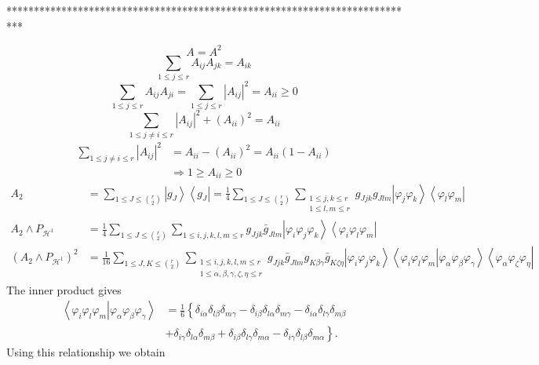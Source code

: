 \documentclass[aps,preprint]{revtex4}%
\begin{document}
\bigskip

***************************************************************************%

\begin{equation}
A=A^{2}%
\end{equation}%
\begin{equation}
\sum_{1\leq j\leq r}A_{ij}A_{jk}=A_{ik}%
\end{equation}%
\begin{equation}
\sum_{1\leq j\leq r}A_{ij}A_{ji}=\sum_{1\leq j\leq r}\left\vert A_{ij}%
\right\vert ^{2}=A_{ii}\geq0
\end{equation}%
\begin{equation}
\sum_{1\leq j\neq i\leq r}\left\vert A_{ij}\right\vert ^{2}+\left(
A_{ii}\right)  ^{2}=A_{ii}%
\end{equation}%
\begin{align}
\sum_{1\leq j\neq i\leq r}\left\vert A_{ij}\right\vert ^{2}  &  =A_{ii}%
-\left(  A_{ii}\right)  ^{2}=A_{ii}\left(  1-A_{ii}\right) \\
&  \Rightarrow1\geq A_{ii}\geq0
\end{align}
\begin{align}
A_{2}  &  =\sum_{1\leq J\leq\binom{r}{2}}\left\vert g_{J}\right\rangle
\left\langle g_{J}\right\vert =\frac{1}{4}\sum_{1\leq J\leq\binom{r}{2}}%
\sum_{\substack{1\leq j,k\leq r\\1\leq l,m\leq r}}g_{Jjk}g_{Jlm}\left\vert
\varphi_{j}\varphi_{k}\right\rangle \left\langle \varphi_{l}\varphi
_{m}\right\vert \\
A_{2}\wedge P_{\mathcal{H}^{1}}  &  =\frac{1}{4}\sum_{1\leq J\leq\binom{r}{2}%
}\sum_{1\leq i,j,k,l,m\leq r}g_{Jjk}\bar{g}_{Jlm}\left\vert \varphi_{i}%
\varphi_{j}\varphi_{k}\right\rangle \left\langle \varphi_{i}\varphi_{l}%
\varphi_{m}\right\vert \\
\left(  A_{2}\wedge P_{\mathcal{H}^{1}}\right)  ^{2}  &  =\frac{1}{16}%
\sum_{1\leq J,K\leq\binom{r}{2}}\sum_{\substack{1\leq i,j,k,l,m\leq
r\\1\leq\alpha,\beta,\gamma,\zeta,\eta\leq r}}g_{Jjk}\bar{g}_{Jlm}%
g_{K\beta\gamma}\bar{g}_{K\zeta\eta}\left\vert \varphi_{i}\varphi_{j}%
\varphi_{k}\right\rangle \left\langle \varphi_{i}\varphi_{l}\varphi
_{m}\left\vert \varphi_{\alpha}\varphi_{\beta}\varphi_{\gamma}\right.
\right\rangle \left\langle \varphi_{\alpha}\varphi_{\zeta}\varphi_{\eta
}\right\vert
\end{align}
The inner product gives
\begin{align}
\left\langle \varphi_{i}\varphi_{l}\varphi_{m}\left\vert \varphi_{\alpha
}\varphi_{\beta}\varphi_{\gamma}\right.  \right\rangle  &  =\frac{1}%
{6}\left\{  \delta_{i\alpha}\delta_{l\beta}\delta_{m\gamma}-\delta_{i\beta
}\delta_{l\alpha}\delta_{m\gamma}-\delta_{i\alpha}\delta_{l\gamma}%
\delta_{m\beta}\right. \nonumber\\
&  +\left.  \delta_{i\gamma}\delta_{l\alpha}\delta_{m\beta}+\delta_{i\beta
}\delta_{l\gamma}\delta_{m\alpha}-\delta_{i\gamma}\delta_{l\beta}%
\delta_{m\alpha}\right\}  .
\end{align}
Using this relationship we obtain%
\end{document}

